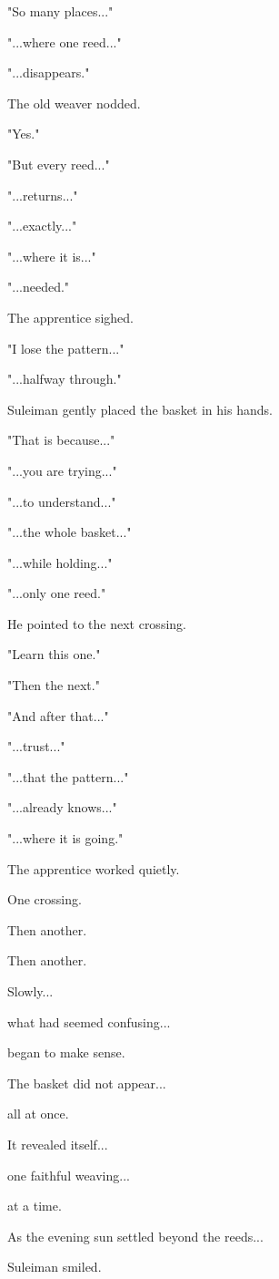 \documentclass[12pt,openany]{book}
\begin{document}
"So many places..."

"...where one reed..."

"...disappears."

The old weaver nodded.

"Yes."

"But every reed..."

"...returns..."

"...exactly..."

"...where it is..."

"...needed."

The apprentice sighed.

"I lose the pattern..."

"...halfway through."

Suleiman gently placed the basket in his hands.

"That is because..."

"...you are trying..."

"...to understand..."

"...the whole basket..."

"...while holding..."

"...only one reed."

He pointed to the next crossing.

"Learn this one."

"Then the next."

"And after that..."

"...trust..."

"...that the pattern..."

"...already knows..."

"...where it is going."

The apprentice worked quietly.

One crossing.

Then another.

Then another.

Slowly...

what had seemed confusing...

began to make sense.

The basket did not appear...

all at once.

It revealed itself...

one faithful weaving...

at a time.

As the evening sun settled beyond the reeds...

Suleiman smiled.
\end{document}
